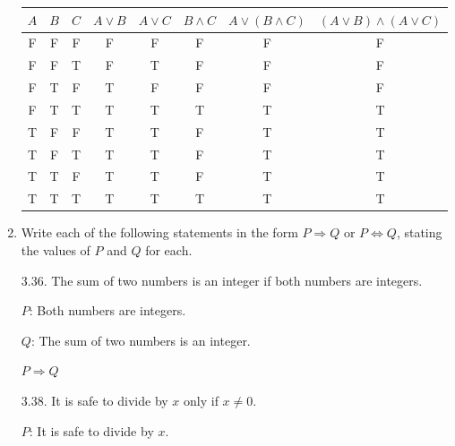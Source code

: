 \documentclass[10pt]{article}
\begin{document}
\begin{enumerate}[label={}]
            \begin{tabular}{ |c|c|c|c|c|c|c|c|  }
                  \hline
                  $A$ & $B$ & $C$ & $A \vee B$ & $A \vee C$ & $B \wedge C$ & $A \vee(B \wedge C)$ & $(A \vee B) \wedge(A \vee C)$ \\
                  \hline
                  F   & F   & F   & F          & F          & F            & F                    & F                             \\
                  F   & F   & T   & F          & T          & F            & F                    & F                             \\
                  F   & T   & F   & T          & F          & F            & F                    & F                             \\
                  F   & T   & T   & T          & T          & T            & T                    & T                             \\
                  T   & F   & F   & T          & T          & F            & T                    & T                             \\
                  T   & F   & T   & T          & T          & F            & T                    & T                             \\
                  T   & T   & F   & T          & T          & F            & T                    & T                             \\
                  T   & T   & T   & T          & T          & T            & T                    & T                             \\
                  \hline
            \end{tabular}

      \item Write each of the following statements in the form $P \Rightarrow Q$ or $P \Leftrightarrow Q$, stating the values of $P$ and $Q$ for each.

            3.36. The sum of two numbers is an integer if both numbers are integers.

            $P$: Both numbers are integers.

            $Q$: The sum of two numbers is an integer.

            $P \Rightarrow Q$


            3.38. It is safe to divide by $x$ only if $x \neq 0$.

            $P$: It is safe to divide by $x$.


\end{enumerate}
\end{document}
